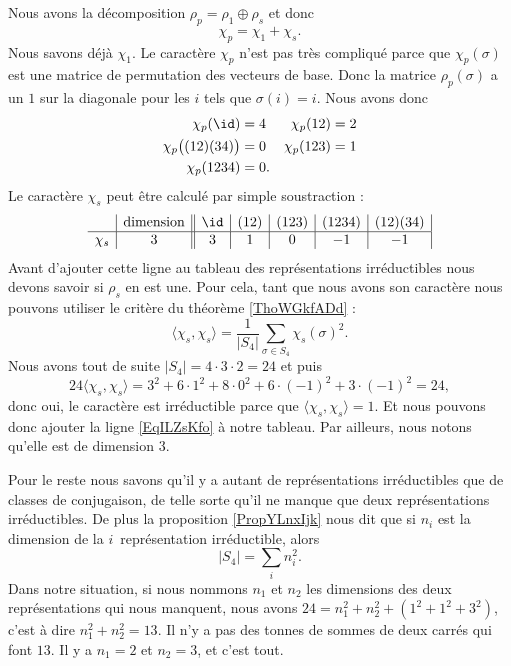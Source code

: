 Nous avons la décomposition \( \rho_p=\rho_1\oplus \rho_s\) et donc
\begin{equation}
    \chi_p=\chi_1+\chi_s.
\end{equation}
Nous savons déjà \( \chi_1\). Le caractère \( \chi_p\) n'est pas très compliqué parce que \( \chi_p(\sigma)\) est une matrice de permutation des vecteurs de base. Donc la matrice \( \rho_p(\sigma)\) a un \( 1 \) sur la diagonale pour les \( i\) tels que \( \sigma(i)=i\). Nous avons donc
\begin{subequations}
    \begin{align}
    \chi_p(\id)&=4&\chi_p(12)&=2\\
    \chi_p\big( (12)(34) \big)&=0&\chi_p(123)&=1\\
    \chi_p(1234)&=0.
    \end{align}
\end{subequations}
Le caractère \( \chi_s\) peut être calculé par simple soustraction :
\begin{equation}   \label{EqILZsKfo}
    \begin{array}[]{c|c||c|c|c|c|c|}
        &\text{dimension}&\id&(12)&(123)&(1234)&(12)(34)\\
          \hline
          \chi_s&3&3&1&0&-1&-1\\ 
    \end{array}
\end{equation}
Avant d'ajouter cette ligne au tableau des représentations irréductibles nous devons savoir si \( \rho_s\) en est une. Pour cela, tant que nous avons son caractère nous pouvons utiliser le critère du théorème \ref{ThoWGkfADd} :
\begin{equation}
    \langle \chi_s, \chi_s\rangle =\frac{1}{ | S_4 | }\sum_{\sigma\in S_4}\chi_s(\sigma)^2.
\end{equation}
Nous avons tout de suite \( | S_4 |=4\cdot 3\cdot 2=24\) et puis
\begin{equation}
    24\langle \chi_s, \chi_s\rangle =3^2+6\cdot 1^2+8\cdot 0^2+6\cdot(-1)^2+3\cdot (-1)^2=24,
\end{equation}
donc oui, le caractère est irréductible parce que \( \langle \chi_s, \chi_s\rangle =1\). Et nous pouvons donc ajouter la ligne \eqref{EqILZsKfo} à notre tableau. Par ailleurs, nous notons qu'elle est de dimension \( 3\).

Pour le reste nous savons qu'il y a autant de représentations irréductibles que de classes de conjugaison, de telle sorte qu'il ne manque que deux représentations irréductibles. De plus la proposition \ref{PropYLnxIjk} nous dit que si \( n_i\) est la dimension de la \( i\)\ieme\ représentation irréductible, alors
\begin{equation}
    | S_4 |=\sum_in_i^2.
\end{equation}
Dans notre situation, si nous nommons \( n_1\) et \( n_2\) les dimensions des deux représentations qui nous manquent, nous avons \( 24=n_1^2+n_2^2+(1^2+1^2+3^2)\), c'est à dire \( n_1^2+n_2^2=13\). Il n'y a pas des tonnes de sommes de deux carrés qui font \( 13\). Il y a \( n_1=2\) et \( n_2=3\), et c'est tout.

